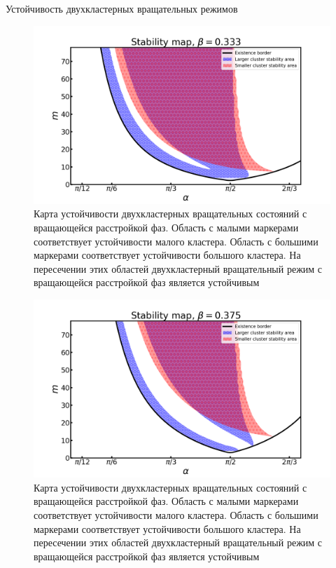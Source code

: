 \begin{chapter}{Устойчивость двухкластерных вращательных режимов}
	\begin{figure}[h!]\center
		\includegraphics[width=1\columnwidth]{pictures/Figure_333.png}
		\caption{Карта устойчивости двухкластерных вращательных состояний с вращающейся расстройкой фаз.
		Область с малыми маркерами соответствует устойчивости малого кластера.
		Область с большими маркерами соответствует устойчивости большого кластера.
		На пересечении этих областей двухкластерный вращательный режим с вращающейся расстройкой фаз является устойчивым}
		\label{map-0-33}
	\end{figure}


	\begin{figure}[h!]\center
		\includegraphics[width=1\columnwidth]{pictures/Figure_375.png}
		\caption{Карта устойчивости двухкластерных вращательных состояний с вращающейся расстройкой фаз.
		Область с малыми маркерами соответствует устойчивости малого кластера.
		Область с большими маркерами соответствует устойчивости большого кластера.
		На пересечении этих областей двухкластерный вращательный режим с вращающейся расстройкой фаз является устойчивым}
		\label{map-0375}
	\end{figure}


\end{chapter}
